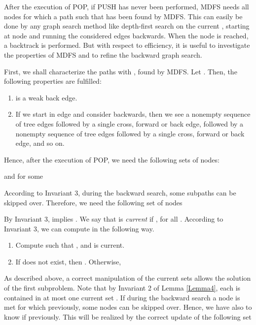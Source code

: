 \documentclass[12pt,twoside,a4paper]{article}
\begin{document}
After the execution of POP, if PUSH has never been performed, 
MDFS needs all nodes  for which a path  such that 
 has been found by MDFS.
This can easily be done by any graph search method like depth-first search on the
current , starting at node  and running the considered edges backwards. 
When the node  is reached, a backtrack is performed. But with respect
to efficiency, it is useful to investigate the properties of MDFS and to
refine the backward graph search. 

First, we shall characterize the paths  with , found by MDFS. Let . Then, the following 
properties are fulfilled:
\begin{enumerate}
\item 
 is a weak back edge.
\item
If we start in edge  and consider  backwards, then we see a nonempty sequence
of tree edges followed by a single cross, forward or back edge, followed by a 
nonempty sequence of tree edges followed by a single cross, forward or 
back edge, and so on.
\end{enumerate}
Hence, after the execution of POP, we need the following sets
of nodes:

and for some 

According to Invariant 3, during the backward search, some subpaths can be
skipped over. Therefore, we need the following set of nodes

By Invariant 3,  implies . 
We say that  is {\em current\/} if , for all .
According to Invariant 3, we can compute  in the following way.
\begin{enumerate}
\item Compute  such that , and  is 
current.
\item If  does not exist, then . Otherwise, 

\end{enumerate} 
As described above, a correct manipulation of the current sets  
allows the solution of the first subproblem. Note that by Invariant 2
of Lemma \ref{Lemma4}, each 
 is contained in at most one current set . 
If during the backward search a node  is met for which 
previously, some nodes can be skipped over. Hence, we have also to know 
if  previously. This will be realized by the correct 
update of the following set
\end{document}
